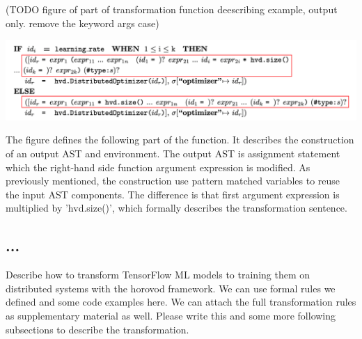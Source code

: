 (TODO figure of part of transformation function deescribing example,
output only. remove the keyword args case)

\includegraphics[width=15cm]{trans_ex02}

The figure defines the following part of the function.
It describes the construction of an output AST and environment.
The output AST is assignment statement which
the right-hand side function argument expression is modified.
As previously mentioned, the construction use pattern matched variables
to reuse the input AST components.
The difference is that first argument expression is multiplied by 'hvd.size()',
which formally describes the transformation sentence.


\subsection{...}
Describe how to transform TensorFlow ML models to training them on distributed
systems with the horovod framework. We can use formal rules we defined and some
code examples here. We can attach the full transformation rules as
supplementary material as well.  Please write this and some more following
subsections to describe the transformation.
